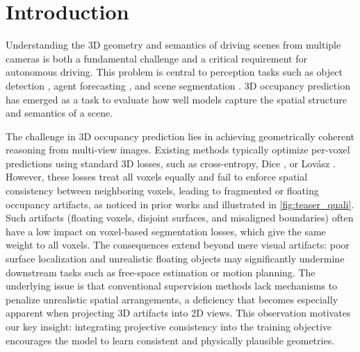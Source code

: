 





\section{Introduction}

Understanding the 3D geometry and semantics of driving scenes from multiple cameras is both a fundamental challenge and a critical requirement for autonomous driving. This problem is central to perception tasks such as object detection \cite{li2022bevformer, liu2022petr, li2023bevdepth, lin2022sparse4d, jiang2024far3d, zou2024unim}, agent forecasting \cite{kim2021lapred, yuan2021agentformer, gu2023vip3d, feng2024unitraj, shi2024mtrpp, shi2022motion, xu2024towardsmotion, xu2024ppt}, and scene segmentation \cite{chambon2024pointbev, gui2024fiptr, hu2021fiery, hu2022stp3, bartoccioni2022lara, harley2022simple, sirkogalouchenko2024occfeat}.
3D occupancy prediction \cite{vobecky2023pop3d, huang2023tpv, wei2023surroundocc, jiang2024symphonies, li2023fbocc3d} has emerged as a task to evaluate how well models capture the spatial structure and semantics of a scene.

The challenge in 3D occupancy prediction lies in achieving geometrically coherent reasoning from multi-view images.
Existing methods \citep{wei2023surroundocc,huang2023tpv,huang2024gaussianformer2,li2023voxformer} typically optimize per-voxel predictions using standard 3D losses, such as cross-entropy, Dice \cite{sudre2017generalised}, or Lovász \cite{berman2018lovasz}. However, these losses treat all voxels equally and fail to enforce spatial consistency between neighboring voxels, leading to fragmented or floating occupancy artifacts, {as {noticed in prior works \citep{liu2024sparseocc} and} illustrated in \autoref{fig:teaser_quali}}. 
{Such artifacts (floating voxels, disjoint surfaces, and misaligned boundaries) often have a low impact on voxel-based segmentation losses, which give the same weight to all voxels.}
The consequences extend beyond mere visual artifacts: poor surface localization and unrealistic floating objects may significantly undermine downstream tasks such as free-space estimation or motion planning.
{The underlying issue is that conventional supervision methods lack mechanisms to penalize unrealistic spatial arrangements, a deficiency that becomes especially apparent when projecting 3D artifacts into 2D views.}
{This observation motivates our key insight: integrating projective consistency into the training objective encourages the model to learn consistent and physically plausible geometries.}

